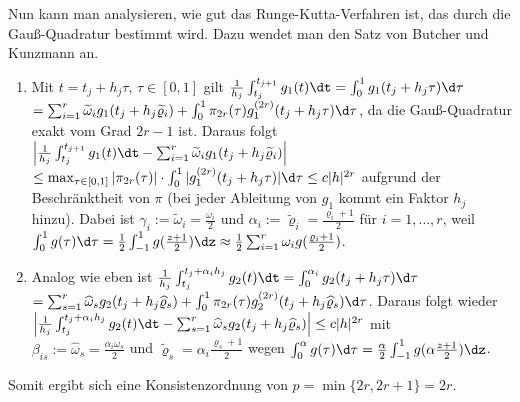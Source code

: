 \begin{Bem}
    Nun kann man analysieren, wie gut das Runge-Kutta-Verfahren ist, das durch
    die Gauß-Quadratur bestimmt wird.
    Dazu wendet man den Satz von Butcher und Kunzmann an.
    \begin{enumerate}[label=(\emph{\roman*})]
        \item
        Mit $t = t_j + h_j \tau$, $\tau \in [0, 1]$ gilt
        $\frac{1}{h_j} \int_{t_j}^{t_{j+1}} g_1(t)\dt =
        \int_0^1 g_1(t_j + h_j \tau)\d\tau$\\
        $=
        \sum_{i=1}^r \widetilde{\omega}_i g_1(t_j + h_j \widetilde{\varrho}_i)
        + \int_0^1 \pi_{2r}(\tau) g_1^{(2r)}(t_j + h_j \tau) \d\tau$,
        da die Gauß-Quadratur exakt vom Grad $2r - 1$ ist.
        Daraus folgt
        $\left|\frac{1}{h_j} \int_{t_j}^{t_{j+1}} g_1(t)\dt -
        \sum_{i=1}^r \widetilde{\omega}_i g_1(t_j + h_j \widetilde{\varrho}_i)
        \right|$\\
        $\le \max_{\tau \in [0, 1]} |\pi_{2r}(\tau)| \cdot
        \int_0^1 |g_1^{(2r)}(t_j + h_j \tau)| \d\tau \le c |h|^{2r}$
        aufgrund der Beschränktheit von $\pi$
        (bei jeder Ableitung von $g_1$ kommt ein Faktor $h_j$ hinzu).
        Dabei ist $\gamma_i := \widetilde{\omega}_i = \frac{\omega_i}{2}$
        und $\alpha_i := \widetilde{\varrho}_i = \frac{\varrho_i + 1}{2}$
        für $i = 1, \dotsc, r$, weil
        $\int_0^1 g(\tau)\d\tau = \frac{1}{2} \int_{-1}^1 g(\frac{z+1}{2})\dz
        \approx \frac{1}{2} \sum_{i=1}^r \omega_i g(\frac{\varrho_i + 1}{2})$.

        \item
        Analog wie eben ist
        $\frac{1}{h_j} \int_{t_j}^{t_j + \alpha_i h_j} g_2(t)\dt =
        \int_0^{\alpha_i} g_2(t_j + h_j \tau)\d\tau$\\
        $= \sum_{s=1}^r \widehat{\omega}_s g_2(t_j + h_j \widehat{\varrho}_s) +
        \int_0^1 \pi_{2r}(\tau)
        g_2^{(2r)}(t_j + h_j \widehat{\varrho}_s)\d\tau$. Daraus folgt wieder\\
        $\left|\frac{1}{h_j} \int_{t_j}^{t_j + \alpha_i h_j} g_2(t)\dt -
        \sum_{s=1}^r \widehat{\omega}_s
        g_2(t_j + h_j \widehat{\varrho}_s)\right| \le c |h|^{2r}$ mit\\
        $\beta_{is} := \widehat{\omega}_s = \frac{\alpha_i \omega_s}{2}$
        und $\widetilde{\varrho}_s = \alpha_i \frac{\varrho_s + 1}{2}$ wegen
        $\int_0^\alpha g(\tau)\d\tau =
        \frac{\alpha}{2} \int_{-1}^1 g(\alpha \frac{z + 1}{2})\dz$.
    \end{enumerate}
    Somit ergibt sich eine Konsistenzordnung von $p = \min\{2r, 2r + 1\} = 2r$.
\end{Bem}

